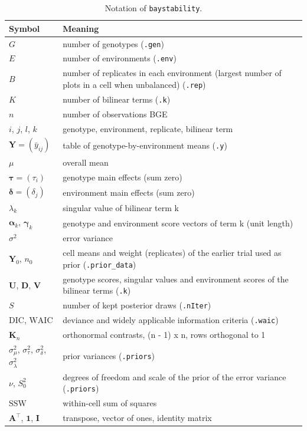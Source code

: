 \begin{longtable}{>{\raggedright\arraybackslash}p{}>{\raggedright\arraybackslash}p{}}
\caption{Notation of \texttt{baystability}.}\\
\toprule
Symbol & Meaning\\
\midrule
\endhead
$G$ & number of genotypes (\texttt{.gen})\\
$E$ & number of environments (\texttt{.env})\\
$B$ & number of replicates in each environment (largest number of plots in a cell when unbalanced) (\texttt{.rep})\\
$K$ & number of bilinear terms (\texttt{.k})\\
$n$ & number of observations BGE\\
$i$, $j$, $l$, $k$ & genotype, environment, replicate, bilinear term\\
$\mathbf{Y} = (\bar{y}_{ij})$ & table of genotype-by-environment means (\texttt{.y})\\
$\mu$ & overall mean\\
$\boldsymbol{\tau} = (\tau_i)$ & genotype main effects (sum zero)\\
$\boldsymbol{\delta} = (\delta_j)$ & environment main effects (sum zero)\\
$\lambda_k$ & singular value of bilinear term k\\
$\boldsymbol{\alpha}_k$, $\boldsymbol{\gamma}_k$ & genotype and environment score vectors of term k (unit length)\\
$\sigma^2$ & error variance\\
$\mathbf{Y}_0$, $n_0$ & cell means and weight (replicates) of the earlier trial used as prior (\texttt{.prior\_data})\\
$\mathbf{U}$, $\mathbf{D}$, $\mathbf{V}$ & genotype scores, singular values and environment scores of the bilinear terms (\texttt{.k})\\
$S$ & number of kept posterior draws (\texttt{.nIter})\\
$\mathrm{DIC}$, $\mathrm{WAIC}$ & deviance and widely applicable information criteria (\texttt{.waic})\\
$\mathbf{K}_n$ & orthonormal contrasts, (n - 1) x n, rows orthogonal to 1\\
$\sigma^2_\mu$, $\sigma^2_\tau$, $\sigma^2_\delta$, $\sigma^2_\lambda$ & prior variances (\texttt{.priors})\\
$\nu$, $S^2_0$ & degrees of freedom and scale of the prior of the error variance (\texttt{.priors})\\
$\mathrm{SSW}$ & within-cell sum of squares\\
$\mathbf{A}^\top$, $\mathbf{1}$, $\mathbf{I}$ & transpose, vector of ones, identity matrix\\
\bottomrule
\end{longtable}
